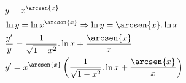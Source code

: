 \begin{ex}
\begin{align}
&y=x^{\arcsen{x}}\nonumber\\
&\ln{y}=\ln{x^{\arcsen{x}}} \Rightarrow \ln{y}=\arcsen{x}.\ln{x}\nonumber\\
&\frac{y'}{y}=\frac{1}{\sqrt{1-x^2}}.\ln{x}+\frac{\arcsen{x}}{x}\nonumber\\
&y'=x^{\arcsen{x}}\left(\frac{1}{\sqrt{1-x^2}}.\ln{x}+\frac{\arcsen{x}}{x}\right)\nonumber
\end{align}
\end{ex}

